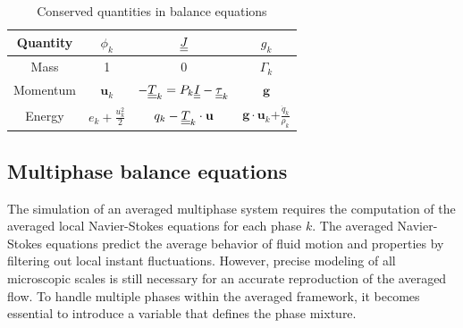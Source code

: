 \begin{table}[!ht]
\centering
   \begin{tabular}{c  c  c  c}
    \toprule
     Quantity & $\phi_k$ & $\underline{\underline{J}}$ & $g_k$  \\
    \midrule
     \rowcolor[gray]{0.9} Mass & 1 & 0 & $\Gamma_k$ \\
     Momentum & $\mathbf{u}_k$ & $-\underline{\underline{T}}_k=P_k\underline{\underline{I}}-\underline{\underline{\tau}}_k$ & $\mathbf{g}$ \\
    \rowcolor[gray]{0.9} Energy & $e_k+\frac{u_k^2}{2}$ & $q_k-\underline{\underline{T}}_k\cdot\mathbf{u}$ & $\mathbf{g}\cdot{}\mathbf{u}_k$+$\frac{\dot{q}_k}{\rho_k}$\\
     \bottomrule
   \end{tabular}
\caption{Conserved quantities in balance equations}
\label{tab:quantities}
\end{table}

\subsection{Multiphase balance equations}

The simulation of an averaged multiphase system requires the computation of the averaged local Navier-Stokes equations for each phase $k$. The averaged Navier-Stokes equations predict the average behavior of fluid motion and properties by filtering out local instant fluctuations. However, precise modeling of all microscopic scales is still necessary for an accurate reproduction of the averaged flow. To handle multiple phases within the averaged framework, it becomes essential to introduce a variable that defines the phase mixture.

